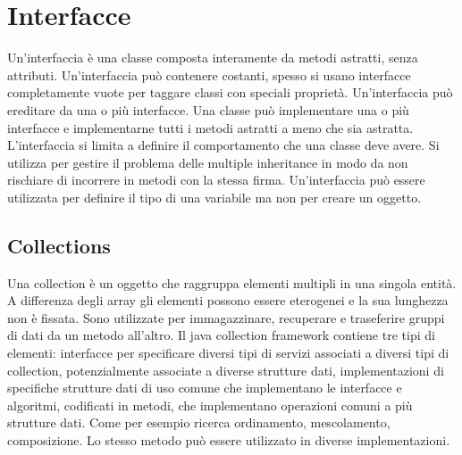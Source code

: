 \chapter{Interfacce}
Un'interfaccia \`e una classe composta interamente da metodi astratti, senza attributi. Un'interfaccia pu\`o contenere costanti, spesso si usano interfacce completamente
vuote per taggare classi con speciali propriet\`a. Un'interfaccia pu\`o ereditare da una o pi\`u interfacce. Una classe pu\`o implementare una o pi\`u interfacce e 
implementarne tutti i metodi astratti a meno che sia astratta. L'interfaccia si limita a definire il comportamento che una classe deve avere. Si utilizza per gestire il
problema delle multiple inheritance in modo da non rischiare di incorrere in metodi con la stessa firma. Un'interfaccia pu\`o essere utilizzata per definire il tipo 
di una variabile ma non per creare un oggetto.
\section{Collections}
Una collection \`e un oggetto che raggruppa elementi multipli in una singola entit\`a. A differenza degli array gli elementi possono essere eterogenei e la sua lunghezza
non \`e fissata. Sono utilizzate per immagazzinare, recuperare e traseferire gruppi di dati da un metodo all'altro. Il java collection framework contiene tre tipi di elementi: interfacce per specificare diversi tipi di servizi associati a diversi tipi di collection, potenzialmente associate a diverse strutture dati, implementazioni 
di specifiche strutture dati di uso comune che implementano le interfacce e algoritmi, codificati in metodi, che implementano operazioni comuni a pi\`u strutture dati. 
Come per esempio ricerca ordinamento, mescolamento, composizione. Lo stesso metodo pu\`o essere utilizzato in diverse implementazioni. 
